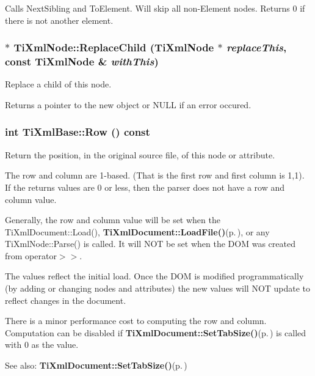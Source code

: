 Calls Next\-Sibling and To\-Element. Will skip all non-Element nodes. Returns 0 if there is not another element.
\subsubsection{ $\ast$ Ti\-Xml\-Node::Replace\-Child ({\bf Ti\-Xml\-Node} $\ast$ {\em replace\-This}, const {\bf Ti\-Xml\-Node} \& {\em with\-This})\hspace{0.3cm}{\tt  [inherited]}}\label{classTiXmlNode_TiXmlUnknowna36}


Replace a child of this node. 

Returns a pointer to the new object or NULL if an error occured.
\subsubsection{\setlength{\rightskip}{0pt plus 5cm}int Ti\-Xml\-Base::Row () const\hspace{0.3cm}{\tt  [inline, inherited]}}\label{classTiXmlBase_TiXmlUnknowna78}


Return the position, in the original source file, of this node or attribute. 

The row and column are 1-based. (That is the first row and first column is 1,1). If the returns values are 0 or less, then the parser does not have a row and column value.

Generally, the row and column value will be set when the Ti\-Xml\-Document::Load(), {\bf Ti\-Xml\-Document::Load\-File()}{\rm (p.\,\pageref{classTiXmlDocument_TiXmlDocumenta6})}, or any Ti\-Xml\-Node::Parse() is called. It will NOT be set when the DOM was created from operator$>$$>$.

The values reflect the initial load. Once the DOM is modified programmatically (by adding or changing nodes and attributes) the new values will NOT update to reflect changes in the document.

There is a minor performance cost to computing the row and column. Computation can be disabled if {\bf Ti\-Xml\-Document::Set\-Tab\-Size()}{\rm (p.\,\pageref{classTiXmlDocument_TiXmlDocumenta20})} is called with 0 as the value.

\begin{Desc}
\item[See also:]{\bf Ti\-Xml\-Document::Set\-Tab\-Size()}{\rm (p.\,\pageref{classTiXmlDocument_TiXmlDocumenta20})}\end{Desc}
